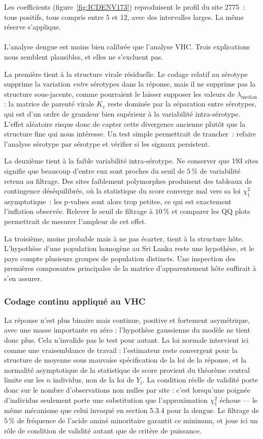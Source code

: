 \documentclass[11pt,a4paper]{article}
\begin{document}
Les coefficients (figure~\ref{fig:ICDENV173}) reproduisent le profil du site 2775~: tous positifs,
tous compris entre $5$ et $12$, avec des intervalles larges. La même réserve s'applique.
\\
\\
L'analyse dengue est moins bien calibrée que l'analyse VHC. Trois explications nous semblent plausibles, et elles ne s'excluent pas.
 
La première tient à la structure virale résiduelle. Le codage relatif au sérotype supprime la
variation \emph{entre} sérotypes dans la réponse, mais il ne supprime pas la structure
sous-jacente, comme pourraient le laisser supposer les valeurs de $\lambda_{\text{median}}$ :
la matrice de parenté virale $K_v$ reste dominée par la séparation entre sérotypes,
qui est d'un ordre de grandeur bien supérieur à la variabilité intra-sérotype. L'effet aléatoire
risque donc de capter cette divergence ancienne plutôt que la structure fine qui nous intéresse.
Un test simple permettrait de trancher~: refaire l'analyse sérotype par sérotype et vérifier si
les signaux persistent.

 
La deuxième tient à la faible variabilité intra-sérotype. Ne conserver que 193 sites signifie que
beaucoup d'entre eux sont proches du seuil de $5\,\%$ de variabilité retenu au filtrage. Des sites
faiblement polymorphes produisent des tableaux de contingence déséquilibrés, où la statistique du
score converge mal vers sa loi $\chi^{2}_{1}$ asymptotique~: les p-values sont alors trop petites,
ce qui est exactement l'inflation observée. Relever le seuil de filtrage à $10\,\%$ et comparer les
QQ plots permettrait de mesurer l'ampleur de cet effet.
 
La troisième, moins probable mais à ne pas écarter, tient à la structure hôte. L'hypothèse d'une
population homogène au Sri Lanka reste une hypothèse, et le pays compte plusieurs groupes de
population distincts. Une inspection des premières composantes principales de la matrice
d'apparentement hôte suffirait à s'en assurer.
 
\subsubsection{Codage continu appliqué au VHC}

La réponse n'est plus binaire mais continue, positive et fortement asymétrique, avec une masse importante en zéro : l'hypothèse gaussienne du modèle ne tient donc plus.
Cela n'invalide pas le test pour autant. La loi normale intervient ici comme une vraisemblance de travail :
l'estimateur reste convergent pour la structure de moyenne sous mauvaise spécification de la loi de la réponse,
et la normalité asymptotique de la statistique de score provient du théorème central limite sur les $n$ individus,
non de la loi de $Y_i$. La condition réelle de validité porte donc sur le nombre d'observations non nulles par site :
c'est lorsqu'une poignée d'individus seulement porte une substitution que l'approximation $\chi^2_1$ échoue — le même mécanisme que celui invoqué en section 5.3.4 pour la dengue.
Le filtrage de $5\,\%$ de fréquence de l'acide aminé minoritaire garantit ce minimum, et joue ici un rôle de condition de validité autant que de critère de puissance.
 
\end{document}
